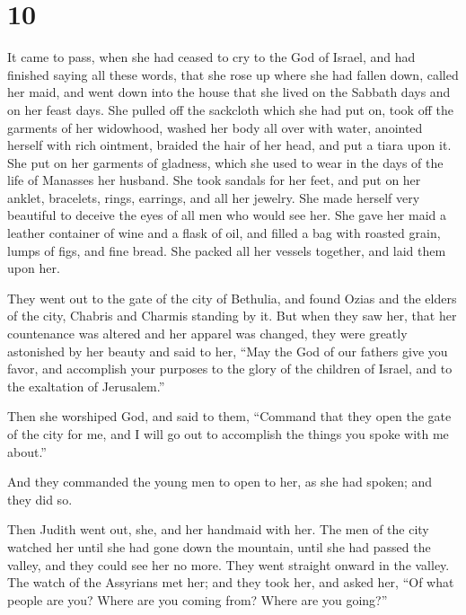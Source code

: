 \hypertarget{section-9}{%
\section{10}\label{section-9}}

 It came to pass, when she had ceased to cry to the God of
Israel, and had finished saying all these words,  that she
rose up where she had fallen down, called her maid, and went down into
the house that she lived on the Sabbath days and on her feast days.
 She pulled off the sackcloth which she had put on, took off
the garments of her widowhood, washed her body all over with water,
anointed herself with rich ointment, braided the hair of her head, and
put a tiara upon it. She put on her garments of gladness, which she used
to wear in the days of the life of Manasses her husband. 
She took sandals for her feet, and put on her anklet, bracelets, rings,
earrings, and all her jewelry. She made herself very beautiful to
deceive the eyes of all men who would see her.  She gave her
maid a leather container of wine and a flask of oil, and filled a bag
with roasted grain, lumps of figs, and fine bread. She packed all her
vessels together, and laid them upon her.

 They went out to the gate of the city of Bethulia, and
found Ozias and the elders of the city, Chabris and Charmis standing by
it.  But when they saw her, that her countenance was altered
and her apparel was changed, they were greatly astonished by her beauty
and said to her,  ``May the God of our fathers give you
favor, and accomplish your purposes to the glory of the children of
Israel, and to the exaltation of Jerusalem.''

Then she worshiped God,  and said to them, ``Command that
they open the gate of the city for me, and I will go out to accomplish
the things you spoke with me about.''

And they commanded the young men to open to her, as she had spoken;
 and they did so.

Then Judith went out, she, and her handmaid with her. The men of the
city watched her until she had gone down the mountain, until she had
passed the valley, and they could see her no more.  They
went straight onward in the valley. The watch of the Assyrians met her;
 and they took her, and asked her, ``Of what people are
you? Where are you coming from? Where are you going?''

